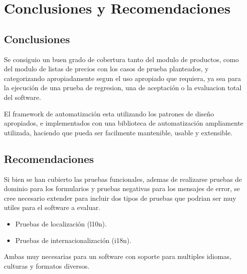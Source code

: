 \chapter{Conclusiones y Recomendaciones}

\section{Conclusiones}
Se consiguio un buen grado de cobertura tanto del modulo de productos, como del
modulo de listas de precios con los casos de prueba planteados, y categorizando
apropiadamente segun el uso apropiado que requiera, ya sea para la ejecución de
una prueba de regresion, una de aceptación o la evaluacion total del software.

El framework de automatización esta utilizando los patrones de diseño
apropiados, e implementados con una biblioteca de automatización ampliamente
utilizada, haciendo que pueda ser facilmente mantenible, usable y extensible.

\section{Recomendaciones}
Si bien se han cubierto las pruebas funcionales, ademas de realizarse pruebas
de dominio para los formularios y pruebas negativas para los mensajes de error,
se cree necesario extender para incluir dos tipos de pruebas que podrian ser
muy utiles para el software a evaluar.

\begin{itemize}
\item Pruebas de localización (l10n).
\item Pruebas de internacionalización (i18n).
\end{itemize}

Ambas muy necesarias para un software con soporte para multiples idiomas,
culturas y formatos diversos.

